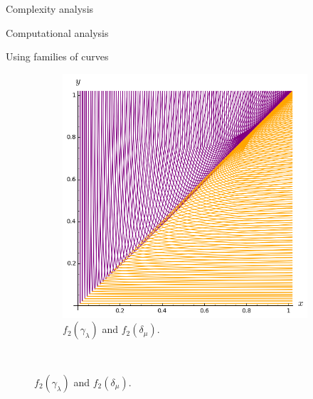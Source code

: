 \documentclass[11pt, a4paper, english, twoside, notitlepage, openright]{report}
\begin{document}
\begin{chapter}{Complexity analysis}
\begin{section}{Computational analysis}
\begin{subsection}{Using families of curves}
\begin{figure}
\begin{subfigure}{.45\linewidth}
\includegraphics[width=1\textwidth]{plots/ch5_30_3curves4.png}
\vspace{-0.4cm}\caption{$f_2(\gamma_{\lambda})$ and $f_2(\delta_{\mu})$.\label{fig:3curves2}}
\end{subfigure}\\[1ex]
\vspace{-0.2cm}


\end{figure}
\end{subsection}
\end{section}
\end{chapter}
\end{document}
